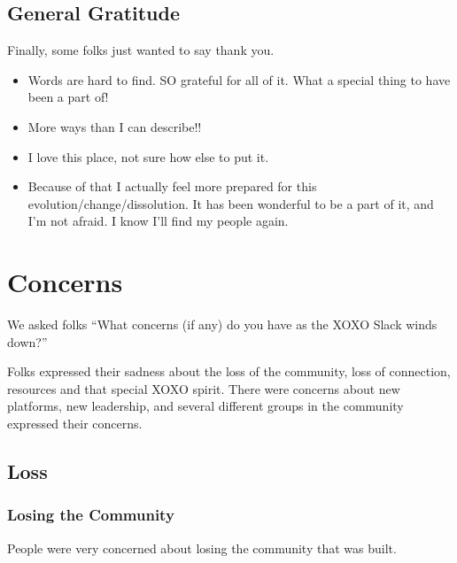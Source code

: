 \documentclass[
]{book}
\providecommand{\tightlist}{%
  \setlength{\itemsep}{0pt}\setlength{\parskip}{0pt}}
\begin{document}
\section{General Gratitude}\label{general-gratitude}

Finally, some folks just wanted to say thank you.

\begin{itemize}
\tightlist
\item
  Words are hard to find. SO grateful for all of it. What a special thing to have been a part of!
\item
  More ways than I can describe!!
\item
  I love this place, not sure how else to put it.
\item
  Because of that I actually feel more prepared for this evolution/change/dissolution. It has been wonderful to be a part of it, and I'm not afraid. I know I'll find my people again.
\end{itemize}

\chapter{Concerns}\label{concerns}

We asked folks ``What concerns (if any) do you have as the XOXO Slack winds down?''

Folks expressed their sadness about the loss of the community, loss of connection, resources and that special XOXO spirit. There were concerns about new platforms, new leadership, and several different groups in the community expressed their concerns.

\section{Loss}\label{loss}

\subsection{Losing the Community}\label{losing-the-community}

People were very concerned about losing the community that was built.
\end{document}

